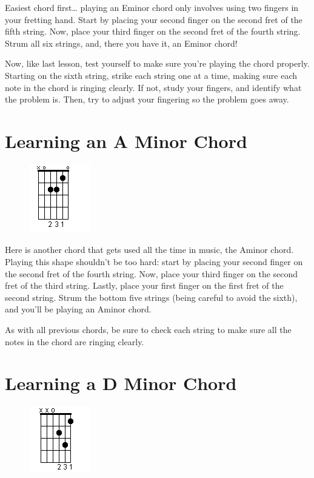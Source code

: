 Easiest chord first\ldots{} playing an Eminor chord only involves using two fingers
in your fretting hand. Start by placing your second finger on the second fret
of the fifth string. Now, place your third finger on the second fret of the
fourth string. Strum all six strings, and, there you have it, an Eminor chord!

Now, like last lesson, test yourself to make sure you're playing the chord
properly. Starting on the sixth string, strike each string one at a time,
making sure each note in the chord is ringing clearly. If not, study your
fingers, and identify what the problem is. Then, try to adjust your fingering
so the problem goes away.

\section{Learning an A Minor Chord}
\begin{figure}
\includegraphics{parttwo/openaminor.png}
\end{figure}

Here is another chord that gets used all the time in music, the Aminor chord.
Playing this shape shouldn't be too hard: start by placing your second finger
on the second fret of the fourth string. Now, place your third finger on the
second fret of the third string. Lastly, place your first finger on the first
fret of the second string. Strum the bottom five strings (being careful to
avoid the sixth), and you'll be playing an Aminor chord.

As with all previous chords, be sure to check each string to make sure all the
notes in the chord are ringing clearly.

\section{Learning a D Minor Chord}
\begin{figure}
\includegraphics{parttwo/opendminor.png}
\end{figure}

